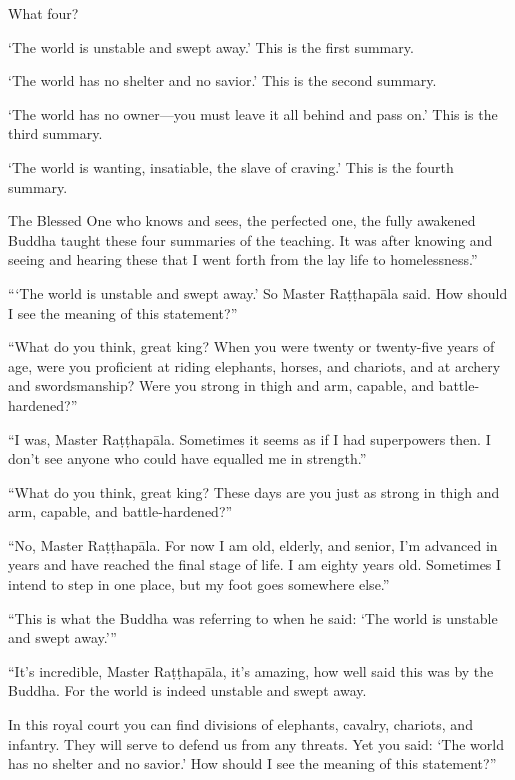 \documentclass[12pt,openany]{book}%
\begin{document}
What four? 

‘The world is unstable and swept away.’ This is the first summary. 

‘The world has no shelter and no savior.’ This is the second summary. 

‘The world has no owner—you must leave it all behind and pass on.’ This is the third summary. 

‘The world is wanting, insatiable, the slave of craving.’ This is the fourth summary. 

The Blessed One who knows and sees, the perfected one, the fully awakened Buddha taught these four summaries of the teaching. It was after knowing and seeing and hearing these that I went forth from the lay life to homelessness.” 

“‘The world is unstable and swept away.’ So Master \textsanskrit{Raṭṭhapāla} said. How should I see the meaning of this statement?” 

“What do you think, great king? When you were twenty or twenty-five years of age, were you proficient at riding elephants, horses, and chariots, and at archery and swordsmanship? Were you strong in thigh and arm, capable, and battle-hardened?” 

“I was, Master \textsanskrit{Raṭṭhapāla}. Sometimes it seems as if I had superpowers then. I don’t see anyone who could have equalled me in strength.” 

“What do you think, great king? These days are you just as strong in thigh and arm, capable, and battle-hardened?” 

“No, Master \textsanskrit{Raṭṭhapāla}. For now I am old, elderly, and senior, I’m advanced in years and have reached the final stage of life. I am eighty years old. Sometimes I intend to step in one place, but my foot goes somewhere else.” 

“This is what the Buddha was referring to when he said: ‘The world is unstable and swept away.’” 

“It’s incredible, Master \textsanskrit{Raṭṭhapāla}, it’s amazing, how well said this was by the Buddha. For the world is indeed unstable and swept away. 

In this royal court you can find divisions of elephants, cavalry, chariots, and infantry. They will serve to defend us from any threats. Yet you said: ‘The world has no shelter and no savior.’ How should I see the meaning of this statement?” 
\end{document}

